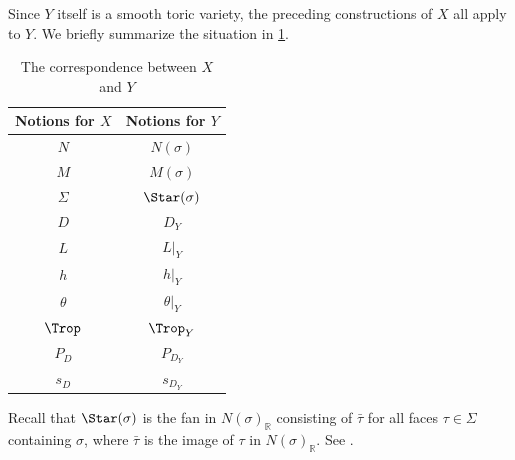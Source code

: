 Since $Y$ itself is a smooth toric variety, the preceding constructions of $X$ all apply to $Y$. We briefly summarize the situation in \cref{Tab:corrXY}.
\begin{table}[ht]
\begin{center}
\begin{tabular}{|c|c|}
  \hline
Notions for $X$ & Notions for $Y$ \\
  \hline
 $N$ & $N(\sigma)$ \\
  \hline
 $M$ & $M(\sigma)$ \\
  \hline
 $\Sigma$ & $\Star(\sigma)$ \\
  \hline
$D$ & $D_Y$ \\
  \hline
  $L$ & $L|_Y$ \\
  \hline
  $h$ & $h|_Y$ \\
  \hline
  $\theta$ & $\theta|_Y$ \\
  \hline
  $\Trop$ & $\Trop_Y$ \\
  \hline
 $P_D$ & $P_{D_Y}$            \\
  \hline
  $s_D$ & $s_{D_Y}$            \\
  \hline
\end{tabular}
\caption{The correspondence between $X$ and $Y$}
\label{Tab:corrXY}
\end{center}
\end{table}

Recall that $\Star(\sigma)$ is the fan in $N(\sigma)_{\mathbb{R}}$ consisting of $\bar{\tau}$ for all faces $\tau\in \Sigma$ containing $\sigma$, where $\bar{\tau}$ is the image of $\tau$ in $N(\sigma)_{\mathbb{R}}$. See \cite[Proposition~3.2.7]{CLS11}.

